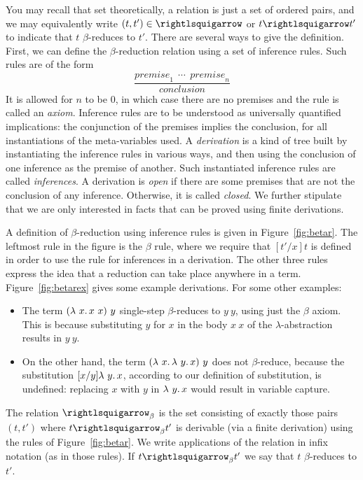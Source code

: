 You may recall that set theoretically, a relation is just a set of
ordered pairs, and we may equivalently write $(t,t')\in\curva$ or $t
\curva t'$ to indicate that $t$ $\beta$-reduces to $t'$.  There are
several ways to give the definition.
First, we can define the $\beta$-reduction relation using a set of inference rules.
Such rules are of the form
\[
\frac{\textit{premise}_1 \ \ \cdots \ \ \textit{premise}_n}{\textit{conclusion}}
\]
\noindent It is allowed for $n$ to be $0$, in which case there are no
premises and the rule is called an \emph{axiom}.  Inference rules are
to be understood as universally quantified implications: the
conjunction of the premises implies the conclusion, for all
instantiations of the meta-variables used.  A \emph{derivation} is a
kind of tree built by instantiating the inference rules in various
ways, and then using the conclusion of one inference as the premise of
another.  Such instantiated inference rules are
called \emph{inferences}.  A derivation is
\emph{open} if there are some premises that are not the conclusion of
any inference.  Otherwise, it is called
\emph{closed}. We further stipulate that we
are only interested in facts that can be proved using finite
derivations.  

A definition of $\beta$-reduction using inference rules is given in
Figure~\ref{fig:betar}.  The leftmost rule in the figure is the
$\beta$ rule, where we require that $[t'/x]t$ is defined
in order to use the rule for inferences in a derivation.  The other
three rules express the idea that a reduction can take place anywhere
in a term.  Figure~\ref{fig:betarex} gives some example derivations.
For some other examples:
\begin{itemize}
\item The term $(\lambda\ x.\, x\ x)\ y$ single-step $\beta$-reduces to $y\ y$,
  using just the $\beta$ axiom.  This is because substituting $y$ for $x$
  in the body $x\ x$ of the $\lambda$-abstraction results in $y\ y$.
\item On the other hand, the term $(\lambda\ x.\, \lambda\ y.\, x)\ y$ does not
  $\beta$-reduce, because the substitution $[x/y]\lambda\ y.\, x$, according
  to our definition of substitution, is undefined: replacing $x$ with $y$ in
  $\lambda\ y.\, x$ would result in variable capture.
  \end{itemize}
  
\begin{definition}
\label{def:beta}
The relation $\curva_\beta$ is the set consisting of exactly those
pairs $(t,t')$ where $t \curva_\beta t'$ is derivable (via a finite derivation) using the
rules of Figure~\ref{fig:betar}.  We write applications of the
relation in infix notation (as in those rules).  If $t \curva_\beta t'$
we say that $t$ $\beta$-reduces to $t'$.  
\end{definition}

